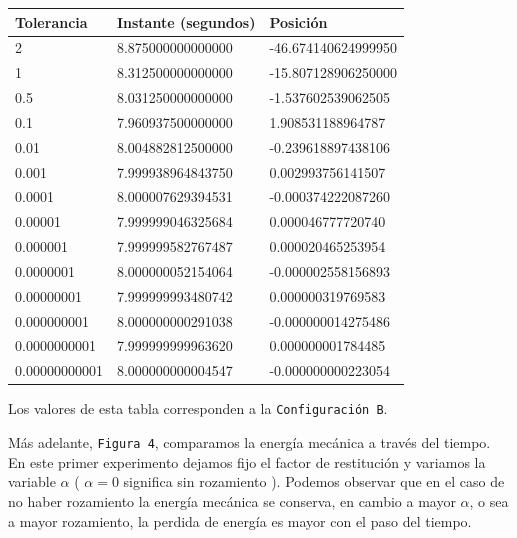 \documentclass[a4paper]{article}
\begin{document}
\vspace{2em}
\begin{center}
\begin{tabular}{|l|l|l|}
  \hline
  Tolerancia & Instante (segundos) & Posición \\
  \hline
  2 & 8.875000000000000 & -46.674140624999950 \\
  1 &  8.312500000000000 & -15.807128906250000 \\
  0.5 & 8.031250000000000 & -1.537602539062505 \\
  0.1 & 7.960937500000000 & 1.908531188964787 \\
  0.01 & 8.004882812500000 & -0.239618897438106 \\
  0.001 & 7.999938964843750 & 0.002993756141507 \\
  0.0001 & 8.000007629394531 & -0.000374222087260 \\
  0.00001 & 7.999999046325684 & 0.000046777720740 \\
  0.000001 & 7.999999582767487 & 0.000020465253954 \\
  0.0000001 & 8.000000052154064 & -0.000002558156893 \\
  0.00000001 & 7.999999993480742 & 0.000000319769583 \\
  0.000000001 & 8.000000000291038 & -0.000000014275486 \\
  0.0000000001 & 7.999999999963620 & 0.000000001784485 \\
  0.00000000001 & 8.000000000004547 & -0.000000000223054 \\
\hline
\end{tabular}
\end{center} 
\centerline{Los valores de esta tabla corresponden a la \texttt{Configuración B}. }
\vspace{1em}

	
Más adelante, \texttt{Figura 4}, comparamos la energía mecánica a través del tiempo. En este primer experimento dejamos fijo el factor de restitución y variamos la variable $\alpha$  ( $\alpha = 0$ significa sin rozamiento ). Podemos observar que en el caso de no haber rozamiento la energía mecánica se conserva, en cambio a mayor $\alpha$, o sea a mayor rozamiento, la perdida de energía es mayor con el paso del tiempo. \\
\end{document}
